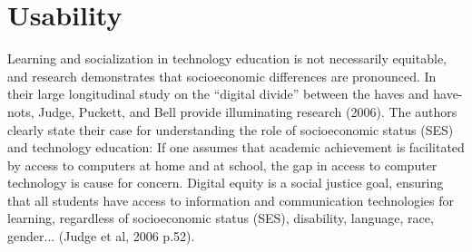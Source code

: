 \section{Usability}
Learning and socialization in technology education is not necessarily equitable, and research demonstrates that socioeconomic differences are pronounced.  In their large longitudinal study on the “digital divide” between the haves and have-nots, Judge, Puckett, and Bell provide illuminating research (2006).  The authors clearly state their case for understanding the role of socioeconomic status (SES) and technology education:
If one assumes that academic achievement is facilitated by access to computers at 
home and at school, the gap in access to computer technology is cause for   
concern. Digital equity is a social justice goal, ensuring that all students have 
access to information and communication technologies for learning, regardless of 
socioeconomic status (SES), disability, language, race, gender... (Judge et al, 2006 
p.52).  
